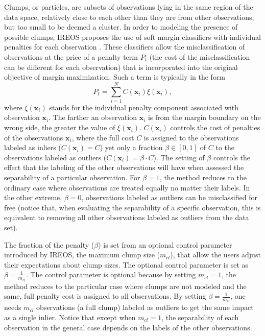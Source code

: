 Clumps, or particles, are subsets of observations lying in the same region of the data space, relatively close to each other than they are from other observations, but too small to be deemed a cluster. In order to modeling the presence of possible clumps, IREOS proposes the use of soft margin classifiers with individual penalties for each observation \cite{osuna1997}. These classifiers allow the misclassification of observations at the price of a penalty term $P_t$ (the cost of the misclassification can be different for each observation) that is incorporated into the original objective of margin maximization. Such a term is typically in the form
\begin{equation}
P_t = \sum_{i = 1}^{N}C(\mathbf{x}_i)\xi(\mathbf{x}_i), 
\end{equation}
where $\xi(\mathbf{x}_i)$ stands for the individual penalty component associated with observation $\mathbf{x}_i$. The farther an observation $\mathbf{x}_i$ is from the margin boundary on the wrong side, the greater the value of $\xi(\mathbf{x}_i)$. $C(\mathbf{x}_i)$ controls the cost of penalties of the observations $\mathbf{x}_i$, where the full cost $C$ is assigned to the observations labeled as inliers ($C(\mathbf{x}_i) = C$) yet only a fraction $\beta \in [0, 1]$ of $C$ to the observations labeled as outliers ($C(\mathbf{x}_i) = \beta \cdot C$). The setting of $\beta$ controls the effect that the labeling of the other observations will have when assessed the separability of a particular observation. For $\beta = 1$, the method reduces to the ordinary case where observations are treated equally no matter their labels. In the other extreme, $\beta = 0$, observations labeled as outliers can be misclassified for free (notice that, when evaluating the separability of a specific observation, this is equivalent to removing all other observations labeled as outliers from the data set).

The fraction of the penalty ($\beta$) is set from an optional control parameter introduced by IREOS, the maximum clump size ($m_{cl}$), that allow the users adjust their expectations about clump sizes. The optional control parameter is set as $\beta = \frac{1}{m_{cl}}$. The control parameter is optional because by setting $m_{cl} = 1$, the method reduces to the particular case where clumps are not modeled and the same, full penalty cost is assigned to all observations. By setting $\beta = \frac{1}{m_{cl}}$, one needs $m_{cl}$ observations (a full clump) labeled as outliers to get the same impact as a single inlier. Notice that except when $m_{cl} = 1$, the separability of each observation in the general case depends on the labels of the other observations.

